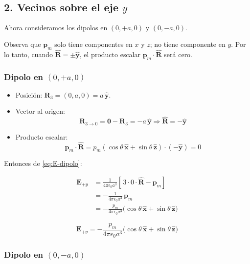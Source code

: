 \documentclass{article}
\begin{document}
\subsection*{2. Vecinos sobre el eje $y$}

Ahora consideramos los dipolos en $(0,+a,0)$ y $(0,-a,0)$.

Observa que $\mathbf{p}_{m}$ solo tiene componentes en $x$ y $z$; no tiene componente en $y$. Por lo tanto, cuando $\hat{\mathbf{R}} = \pm\hat{\mathbf{y}}$, el producto escalar $\mathbf{p}_{m}\cdot\hat{\mathbf{R}}$ será cero.

\subsubsection*{Dipolo en $(0,+a,0)$}

\begin{itemize}
  \item Posición: $\mathbf{R}_{3} = (0,a,0) = a\,\hat{\mathbf{y}}$.
  \item Vector al origen:
    \[
    \mathbf{R}_{3\to 0} = \mathbf{0} - \mathbf{R}_{3}
    = -a\,\hat{\mathbf{y}}
    \Rightarrow \hat{\mathbf{R}} = -\hat{\mathbf{y}}
    \]
  \item Producto escalar:
    \[
    \mathbf{p}_{m}\cdot\hat{\mathbf{R}}
    = p_{m}(\cos\theta\,\hat{\mathbf{x}} + \sin\theta\,\hat{\mathbf{z}})
      \cdot(-\hat{\mathbf{y}}) = 0
    \]
\end{itemize}

Entonces de \eqref{eq:E-dipolo}:

\begin{align}
\mathbf{E}_{+y}
&= \frac{1}{4\pi\epsilon_{0}a^{3}}
\left[\,3\cdot 0\cdot\hat{\mathbf{R}} - \mathbf{p}_{m}\right]\\[4pt]
&= -\frac{1}{4\pi\epsilon_{0}a^{3}}\,\mathbf{p}_{m}\\[4pt]
&= -\frac{p_{m}}{4\pi\epsilon_{0}a^{3}}
\bigl(\cos\theta\,\hat{\mathbf{x}} + \sin\theta\,\hat{\mathbf{z}}\bigr)
\end{align}

\begin{equation}
\boxed{
\mathbf{E}_{+y}
= -\frac{p_{m}}{4\pi\epsilon_{0}a^{3}}
  \bigl(\cos\theta\,\hat{\mathbf{x}} + \sin\theta\,\hat{\mathbf{z}}\bigr)
}
\label{eq:Ey-mas}
\end{equation}

\subsubsection*{Dipolo en $(0,-a,0)$}
\end{document}
